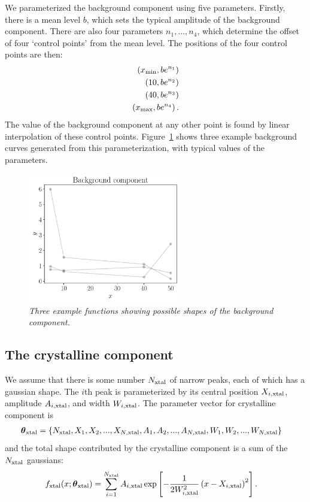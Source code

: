 \documentclass[preprint, a4paper]{elsarticle}
\newcommand{\params}{\boldsymbol{\theta}}
\newcommand{\x}{x}
\begin{document}
We parameterized the background component using
five parameters. Firstly, there is a mean level $b$, which sets the
typical amplitude of the background component. There are also four parameters
$n_1, ..., n_4$, which determine the offset of four `control points'
from the mean level. The positions of the four control points are then:
\begin{align}
\left(\x_{\rm min}, be^{n_1}\right) \nonumber\\
\left(10, be^{n_2}\right) \nonumber\\
\left(40, be^{n_3}\right) \nonumber\\
\left(\x_{\rm max}, be^{n_4}\right). \nonumber
\end{align}
The value of the background component at any other point is found by
linear interpolation of these control points.
Figure~\ref{fig:background} shows three example
background curves generated from this parameterization, with typical
values of the parameters.

\begin{figure}[!ht]
\centering
\includegraphics[width=0.6\textwidth]{figures/background.pdf}
\caption{\it Three example functions showing possible shapes of the
background component.\label{fig:background}}
\end{figure}

\subsection{The crystalline component}
We assume that there is some number $N_{\rm xtal}$ of narrow peaks,
each of which has a gaussian shape. The $i$th peak is parameterized
by its central position $X_{i, \rm xtal}$,
amplitude $A_{i, \rm xtal}$, and width $W_{i, \rm xtal}$.
The parameter vector for crystalline component is
\begin{align}
\params_{\rm xtal} &=
  \{N_{\rm xtal}, X_1, X_2, ..., X_{N, \rm xtal},
    A_1, A_2, ..., A_{N, \rm xtal},
    W_1, W_2, ..., W_{N, \rm xtal}\}
\end{align}
and the total shape contributed by the
crystalline component is a sum of the $N_{\rm xtal}$ gaussians:
\begin{align}
f_{\rm xtal}(\x; \params_{\rm xtal}) &=
    \sum_{i=1}^{N_{\rm xtal}} A_{i, \rm xtal}
 \exp\left[-\frac{1}{2W_{i, \rm xtal}^2}\left(x - X_{i, \rm xtal}\right)^2\right].
\end{align}
\end{document}
